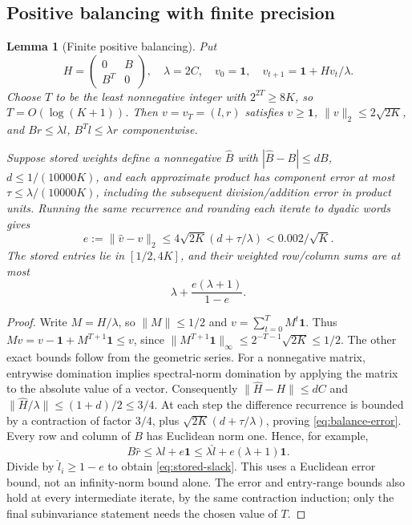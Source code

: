\documentclass[11pt]{article}
\newtheorem{lemma}[theorem]{Lemma}
\theoremstyle{definition}
\newcommand{\norm}[1]{\lVert #1\rVert}
\begin{document}
\subsection{Positive balancing with finite precision}

\begin{lemma}[Finite positive balancing]\label{lem:balance}
Put
\[
 H=\begin{pmatrix}0&B\\B^T&0\end{pmatrix},\quad
 \lambda=2C,\quad
 v_0=\mathbf1,\quad v_{t+1}=\mathbf1+Hv_t/\lambda.
\]
Choose $T$ to be the least nonnegative integer with $2^{2T}\ge8K$, so
$T=O(\log(K+1))$. Then $v=v_T=(l,r)$ satisfies
$v\ge\mathbf1$, $\norm v_2\le2\sqrt{2K}$, and
$Br\le\lambda l$, $B^Tl\le\lambda r$ componentwise.

Suppose stored weights define a nonnegative $\widehat B$ with
$|\widehat B-B|\le dB$, $d\le1/(10000K)$, and each approximate product
has component error at most $\tau\le\lambda/(10000K)$, including the
subsequent division/addition error in product units. Running the same
recurrence and rounding each iterate to dyadic words gives
\begin{equation}\label{eq:balance-error}
 e:=\norm{\widehat v-v}_2
 \le4\sqrt{2K}(d+\tau/\lambda)<0.002/\sqrt K.
\end{equation}
The stored entries lie in $[1/2,4K]$, and their weighted row/column sums
are at most
\begin{equation}\label{eq:stored-slack}
 \lambda+\frac{e(\lambda+1)}{1-e}.
\end{equation}
\end{lemma}
\begin{proof}
Write $M=H/\lambda$, so $\norm M\le1/2$ and
$v=\sum_{t=0}^{T}M^t\mathbf1$. Thus $Mv=v-\mathbf1+M^{T+1}\mathbf1\le v$,
since $\norm{M^{T+1}\mathbf1}_\infty\le2^{-T-1}\sqrt{2K}\le1/2$.
The other exact bounds follow from the geometric series.
For a nonnegative matrix, entrywise domination implies spectral-norm
domination by applying the matrix to the absolute value of a vector.
Consequently $\norm{\widehat H-H}\le dC$ and
$\norm{\widehat H/\lambda}\le(1+d)/2\le3/4$.
At each step the difference recurrence is bounded by a contraction of
factor $3/4$, plus
$\sqrt{2K}(d+\tau/\lambda)$, proving \eqref{eq:balance-error}.
Every row and column of $B$ has Euclidean norm one. Hence, for example,
\[
 B\widehat r\le\lambda l+e\mathbf1
 \le\lambda\widehat l+e(\lambda+1)\mathbf1.
\]
Divide by $\widehat l_i\ge1-e$ to obtain \eqref{eq:stored-slack}.
This uses a Euclidean error bound, not an infinity-norm bound alone.
The error and entry-range bounds also hold at every intermediate iterate,
by the same contraction induction; only the final subinvariance statement
needs the chosen value of $T$.
\end{proof}
\end{document}
